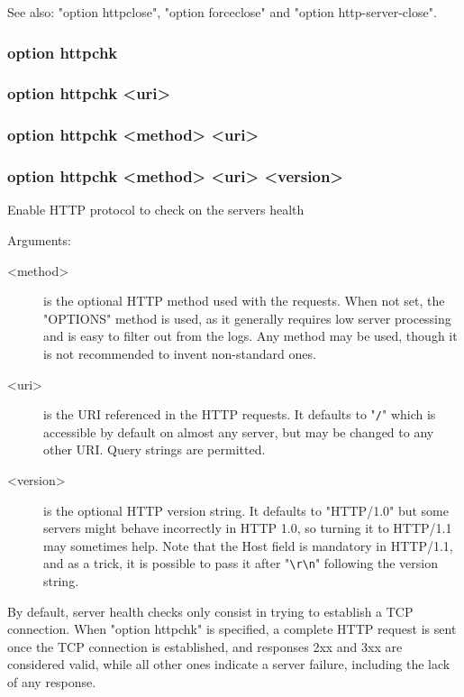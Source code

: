   See also: "option httpclose", "option forceclose" and "option
             http-server-close".


\subsubsection{option httpchk}
\subsubsection*{option httpchk <uri>}
\subsubsection*{option httpchk <method> <uri>}
\subsubsection*{option httpchk <method> <uri> <version>}


  Enable HTTP protocol to check on the servers health


  Arguments:
\begin{description}
\item[<method>]  is the optional HTTP method used with the requests. When not set,
              the "OPTIONS" method is used, as it generally requires low server
              processing and is easy to filter out from the logs. Any method
              may be used, though it is not recommended to invent non-standard
              ones.

\item[<uri>]     is the URI referenced in the HTTP requests. It defaults to "\verb|/|"
              which is accessible by default on almost any server, but may be
              changed to any other URI. Query strings are permitted.

\item[<version>] is the optional HTTP version string. It defaults to "HTTP/1.0"
              but some servers might behave incorrectly in HTTP 1.0, so turning
              it to HTTP/1.1 may sometimes help. Note that the Host field is
              mandatory in HTTP/1.1, and as a trick, it is possible to pass it
              after "\verb|\r\n|" following the version string.
\end{description}

  By default, server health checks only consist in trying to establish a TCP
  connection. When "option httpchk" is specified, a complete HTTP request is
  sent once the TCP connection is established, and responses 2xx and 3xx are
  considered valid, while all other ones indicate a server failure, including
  the lack of any response.

